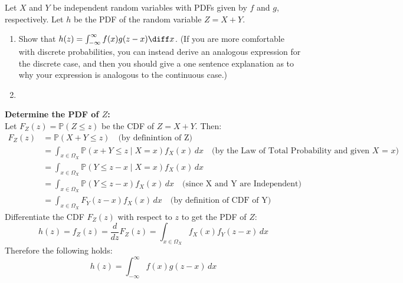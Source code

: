 \documentclass{article}
\begin{document}
\begin{aprob}
    Let $X$ and $Y$ be independent random variables with PDFs given by $f$ and $g$, respectively.
    Let $h$ be the PDF of the random variable $Z = X+Y$.
    \begin{enumerate}
        \item {} Show that $h(z) = \int_{-\infty}^\infty f(x) g( z - x ) \diff x $.  (If you are more comfortable with discrete probabilities, you can instead derive an analogous expression for the discrete case,  and then you should give a one sentence explanation as to why your expression is analogous to the continuous case.)
        \item \optional \color{red}{If $X$ and $Y$ are both independent and uniformly distributed on $[0,1]$ (i.e. $f(x)=g(x)=1$ for $x \in [0,1]$ and $0$ otherwise) what is $h$, the PDF of $Z=X+Y$?}
    \end{enumerate}
    \begin{tcolorbox}[colback=lightgray!10!white, colframe=black, title=A3]
        \textbf{Determine the PDF of $Z$:} \\
        Let $F_Z(z) = \mathbb{P}(Z \leq z)$ be the CDF of $Z = X+Y$. Then:
        \begin{align*}
        F_Z(z) &= \mathbb{P}(X + Y \leq z) \quad \text{(by definintion of Z)} \\
        &= \int_{x \in \Omega_X} \mathbb{P}(x + Y \leq z \mid X = x) f_X(x) \, dx \quad \text{(by the Law of Total Probability and given $X$ = $x$)} \\
        &= \int_{x \in \Omega_X} \mathbb{P}(Y \leq z - x \mid X = x) f_X(x) \, dx \\
        &= \int_{x \in \Omega_X} \mathbb{P}(Y \leq z - x) f_X(x) \, dx \quad \text{(since X and Y are Independent)} \\
        &= \int_{x \in \Omega_X} F_Y(z - x) f_X(x) \, dx \quad \text{(by definition of CDF of Y)}
        \end{align*}
        Differentiate the CDF $F_Z(z)$ with respect to $z$ to get the PDF of $Z$:
        \[
        h(z) = f_Z(z) = \frac{d}{dz} F_Z(z) = \int_{x \in \Omega_X} f_X(x) f_Y(z - x) \, dx
        \]
        Therefore the following holds:
        \[
        h(z) = \int_{-\infty}^\infty f(x) g(z - x) \, dx
        \]
    \end{tcolorbox}
\end{aprob}
\end{document}
